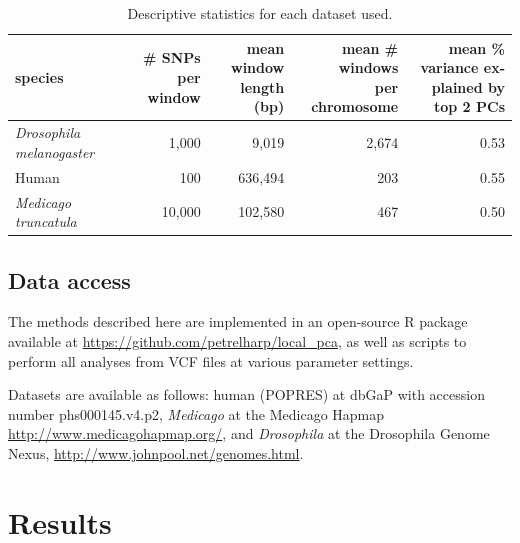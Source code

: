 \documentclass[11pt, oneside]{article}   	%
\renewcommand{\revpoint}[2]{\relax}
\begin{document}
\begin{table}[ht]
\centering
    \begin{tabular}{p{0.8in}rrrr}
  \hline
    species 
    & \parbox[t]{.8in}{\# SNPs per \\ window} 
    & \parbox[t]{1in}{mean window\\ length (bp)}
    & \parbox[t]{1.2in}{mean \# windows \\ per chromosome} 
    & \parbox[t]{1.4in}{mean \% variance ex-\\plained by top 2 PCs} \\ 
  \hline
  \textit{Drosophila melanogaster} & 1,000 & 9,019 & 2,674 & 0.53 \\ 
  Human & 100 & 636,494 & 203 & 0.55 \\ 
  \textit{Medicago truncatula} & 10,000 & 102,580 & 467 & 0.50 \\ 
   \hline
\end{tabular}
\caption{
    Descriptive statistics for each dataset used.
    \label{tab:data_stats}
}
\end{table}

\subsection{Data access}

The methods described here
are implemented in an open-source R package
available at \url{https://github.com/petrelharp/local_pca},
as well as scripts to perform all analyses from VCF files
at various parameter settings.

Datasets are available as follows:
human (POPRES) at dbGaP with accession number phs000145.v4.p2,
\textit{Medicago} at the Medicago Hapmap \url{http://www.medicagohapmap.org/},
and \textit{Drosophila} at the Drosophila Genome Nexus, \url{http://www.johnpool.net/genomes.html}.


\section{Results}
\end{document}
